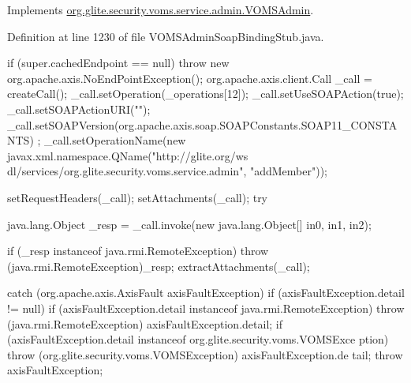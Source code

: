 \label{classorg_1_1glite_1_1security_1_1voms_1_1service_1_1admin_1_1VOMSAdminSoapBindingStub_a02949db1a71d56c534ff5594d764f324}


Implements \hyperlink{interfaceorg_1_1glite_1_1security_1_1voms_1_1service_1_1admin_1_1VOMSAdmin_a1009495645c72839d744c0228b75f2ad}{org.glite.security.voms.service.admin.VOMSAdmin}.



Definition at line 1230 of file VOMSAdminSoapBindingStub.java.


\begin{DoxyCode}
                                                                                 
                                                                                       
       {
        if (super.cachedEndpoint == null) {
            throw new org.apache.axis.NoEndPointException();
        }
        org.apache.axis.client.Call _call = createCall();
        _call.setOperation(_operations[12]);
        _call.setUseSOAPAction(true);
        _call.setSOAPActionURI("");
        _call.setSOAPVersion(org.apache.axis.soap.SOAPConstants.SOAP11_CONSTANTS)
      ;
        _call.setOperationName(new javax.xml.namespace.QName("http://glite.org/ws
      dl/services/org.glite.security.voms.service.admin", "addMember"));

        setRequestHeaders(_call);
        setAttachments(_call);
 try {        java.lang.Object _resp = _call.invoke(new java.lang.Object[] {in0, 
      in1, in2});

        if (_resp instanceof java.rmi.RemoteException) {
            throw (java.rmi.RemoteException)_resp;
        }
        extractAttachments(_call);
  } catch (org.apache.axis.AxisFault axisFaultException) {
    if (axisFaultException.detail != null) {
        if (axisFaultException.detail instanceof java.rmi.RemoteException) {
              throw (java.rmi.RemoteException) axisFaultException.detail;
         }
        if (axisFaultException.detail instanceof org.glite.security.voms.VOMSExce
      ption) {
              throw (org.glite.security.voms.VOMSException) axisFaultException.de
      tail;
         }
   }
  throw axisFaultException;
}
    }
\end{DoxyCode}
